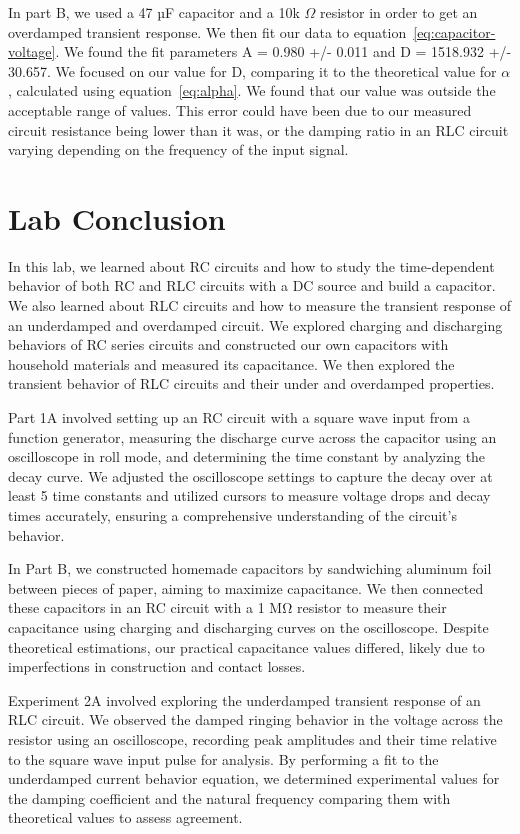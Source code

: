 \documentclass[11pt]{article}
\let\oldsection\section
\renewcommand\section{\clearpage\oldsection}
\begin{document}
    In part B, we used a 47 µF capacitor and a 10k $\Omega$ resistor in order to get an overdamped transient response. We then fit our data to equation~\ref{eq:capacitor-voltage}. We found the fit parameters A = 0.980 +/- 0.011 and D = 1518.932 +/- 30.657. We focused on our value for D, comparing it to the theoretical value for $\alpha$, calculated using equation~\ref{eq:alpha}. We found that our value was outside the acceptable range of values. This error could have been due to our measured circuit resistance being lower than it was, or the damping ratio in an RLC circuit varying depending on the frequency of the input signal.

    \section{Lab Conclusion}\label{sec:conclusion}
    In this lab, we learned about RC circuits and how to study the time-dependent behavior of both RC and RLC circuits with a DC source and build a capacitor. We also learned about RLC circuits and how to measure the transient response of an underdamped and overdamped circuit. We explored charging and discharging behaviors of RC series circuits and constructed our own capacitors with household materials and measured its capacitance. We then explored the transient behavior of RLC circuits and their under and overdamped properties.

    Part 1A involved setting up an RC circuit with a square wave input from a function generator, measuring the discharge curve across the capacitor using an oscilloscope in roll mode, and determining the time constant by analyzing the decay curve. We adjusted the oscilloscope settings to capture the decay over at least 5 time constants and utilized cursors to measure voltage drops and decay times accurately, ensuring a comprehensive understanding of the circuit's behavior.

    In Part B, we constructed homemade capacitors by sandwiching aluminum foil between pieces of paper, aiming to maximize capacitance. We then connected these capacitors in an RC circuit with a 1 MΩ resistor to measure their capacitance using charging and discharging curves on the oscilloscope. Despite theoretical estimations, our practical capacitance values differed, likely due to imperfections in construction and contact losses.

    Experiment 2A involved exploring the underdamped transient response of an RLC circuit. We observed the damped ringing behavior in the voltage across the resistor using an oscilloscope, recording peak amplitudes and their time relative to the square wave input pulse for analysis. By performing a fit to the underdamped current behavior equation, we determined experimental values for the damping coefficient and the natural frequency comparing them with theoretical values to assess agreement.
\end{document}
